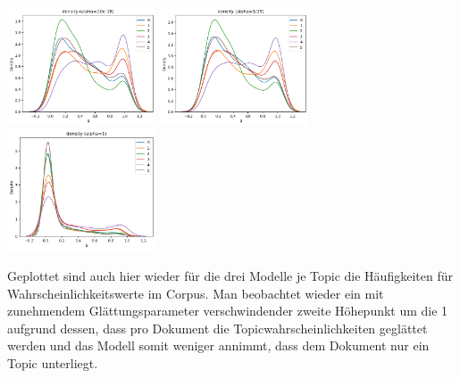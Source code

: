\includegraphics[width=0.33\textwidth]{images/grappling_alpha=10e-18.png}
\includegraphics[width=0.33\textwidth]{images/grappling_alpha=0.066.png}
\includegraphics[width=0.33\textwidth]{images/grappling_alpha=1.png}

\noindent Geplottet sind auch hier wieder für die drei Modelle je Topic die Häufigkeiten für Wahrscheinlichkeitswerte im Corpus. Man beobachtet wieder ein mit zunehmendem Glättungsparameter verschwindender zweite Höhepunkt um die 1 aufgrund dessen, dass pro Dokument die Topicwahrscheinlichkeiten geglättet werden und das Modell somit weniger annimmt, dass dem Dokument nur ein Topic unterliegt.